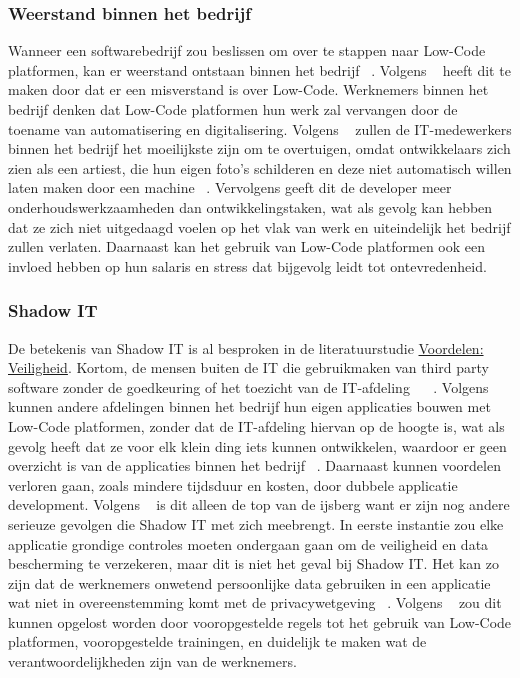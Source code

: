 \subsubsection*{Weerstand binnen het bedrijf}
\label{subsec:weerstand-binnen-het-bedrijf}
Wanneer een softwarebedrijf zou beslissen om over te stappen naar Low-Code platformen, kan er weerstand ontstaan binnen het bedrijf ~\autocite{Elshan2023}. 
Volgens ~\textcite{Elshan2023} heeft dit te maken door dat er een misverstand is over Low-Code. 
Werknemers binnen het bedrijf denken dat Low-Code platformen hun werk zal vervangen door de toename van automatisering en digitalisering. 
Volgens ~\textcite{Elshan2023} zullen de IT-medewerkers binnen het bedrijf het moeilijkste zijn om te overtuigen, omdat ontwikkelaars zich zien als een artiest, 
die hun eigen foto's schilderen en deze niet automatisch willen laten maken door een machine ~\autocite{Elshan2023}. 
Vervolgens geeft dit de developer meer onderhoudswerkzaamheden dan ontwikkelingstaken, 
wat als gevolg kan hebben dat ze zich niet uitgedaagd voelen op het vlak van werk en uiteindelijk het bedrijf zullen verlaten. 
Daarnaast kan het gebruik van Low-Code platformen ook een invloed hebben op hun salaris en stress dat bijgevolg leidt tot ontevredenheid.
\subsubsection*{Shadow IT}
\label{subsec:shadow-it}
De betekenis van Shadow IT is al besproken in de literatuurstudie \hyperref[subsec:veiligheid]{Voordelen: Veiligheid}. Kortom, de mensen buiten de IT die gebruikmaken van third party software
zonder de goedkeuring of het toezicht van de IT-afdeling ~\autocite{Yan2021} ~\autocite{Rokis_2022}. 
 Volgens ~\textcite{Elshan2023} kunnen andere afdelingen binnen het bedrijf hun eigen applicaties bouwen met Low-Code platformen, 
 zonder dat de IT-afdeling hiervan op de hoogte is, wat als gevolg heeft dat ze voor elk klein ding iets kunnen ontwikkelen, waardoor er geen overzicht is van de applicaties binnen het bedrijf ~\autocite{Elshan2023}. 
 Daarnaast kunnen voordelen verloren gaan, zoals mindere tijdsduur en kosten, door dubbele applicatie development. 
 Volgens ~\textcite{Elshan2023} is dit alleen de top van de ijsberg want er zijn nog andere serieuze gevolgen die Shadow IT met zich meebrengt. 
 In eerste instantie zou elke applicatie grondige controles moeten ondergaan gaan om de veiligheid en data bescherming te verzekeren, 
 maar dit is niet het geval bij Shadow IT. Het kan zo zijn dat de werknemers onwetend persoonlijke data gebruiken in een applicatie wat niet in overeenstemming 
 komt met de privacywetgeving ~\autocite{Elshan2023}. Volgens ~\textcite{Elshan2023} zou dit kunnen opgelost worden door vooropgestelde regels tot het 
 gebruik van Low-Code platformen, vooropgestelde trainingen, en duidelijk te maken wat de verantwoordelijkheden zijn van de werknemers.

